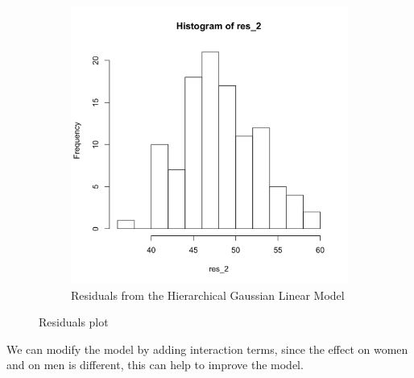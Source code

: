 \documentclass[twoside]{article}
\begin{document}
\begin{figure}[H]
\begin{center}
\begin{subfigure}[h]{0.45\linewidth}
			\includegraphics[width=\linewidth]{Section2R/Figures/P2_15_Res2.png}
			\caption{Residuals from the Hierarchical Gaussian Linear Model}
		\end{subfigure}
		\caption{Residuals plot}
		\label{fig:Fig2}
	\end{center}
\end{figure}


We can modify the model by adding interaction terms, since the effect on women and on men is different, this can help to improve the model.

 
\color{black}  
\end{document}

